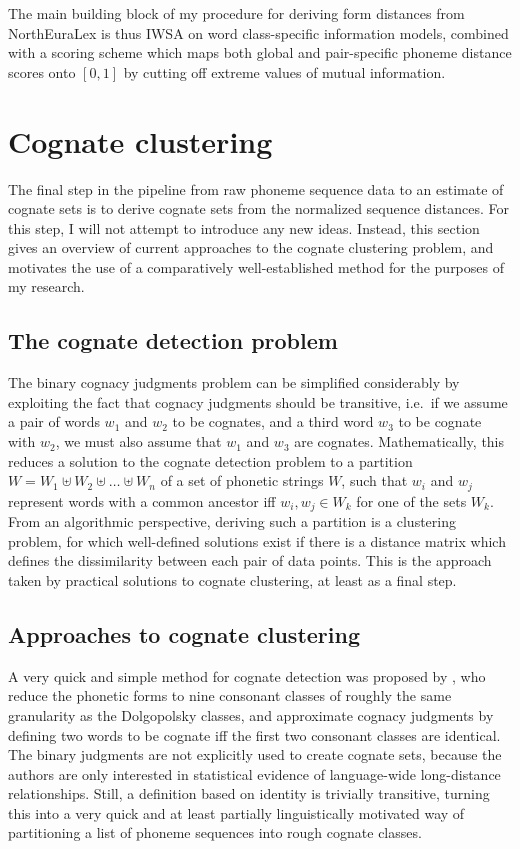 The main building block of my procedure for deriving form distances from NorthEuraLex is thus IWSA on word class-specific information models, combined with a scoring scheme which maps both global and pair-specific phoneme distance scores onto $[0,1]$ by cutting off extreme values of mutual information.

\section{Cognate clustering}\label{sec:4.5}
The final step in the pipeline from raw phoneme sequence data to an estimate of cognate sets is to derive cognate sets from the normalized sequence distances. For this step, I will not attempt to introduce any new ideas. Instead, this section gives an overview of current approaches to the cognate clustering problem, and motivates the use of a comparatively well-established method for the purposes of my research.

\subsection{The cognate detection problem}
The binary cognacy judgments problem can be simplified considerably by exploiting the fact that cognacy judgments should be transitive, i.e.\ if we assume a pair of words $w_1$ and $w_2$ to be cognates, and a third word $w_3$ to be cognate with $w_2$, we must also assume that $w_1$ and $w_3$ are cognates. Mathematically, this reduces a solution to the cognate detection problem to a partition $W = W_1 \uplus W_2 \uplus \dots \uplus W_n$ of a set of phonetic strings $W$, such that $w_i$ and $w_j$ represent words with a common ancestor iff $w_i,w_j \in W_k$ for one of the sets $W_k$. From an algorithmic perspective, deriving such a partition is a clustering problem, for which well-defined solutions exist if there is a distance matrix which defines the dissimilarity between each pair of data points. This is the approach taken by practical solutions to cognate clustering, at least as a final step.

\subsection{Approaches to cognate clustering}
A very quick and simple method for cognate detection was proposed by \cite{turchin_ea_2010}, who reduce the phonetic forms to nine consonant classes of roughly the same granularity as the Dolgopolsky classes, and approximate cognacy judgments by defining two words to be cognate iff the first two consonant classes are identical. The binary judgments are not explicitly used to create cognate sets, because the authors are only interested in statistical evidence of language-wide long-distance relationships. Still, a definition based on identity is trivially transitive, turning this into a very quick and at least partially linguistically motivated way of partitioning a list of phoneme sequences into rough cognate classes.

